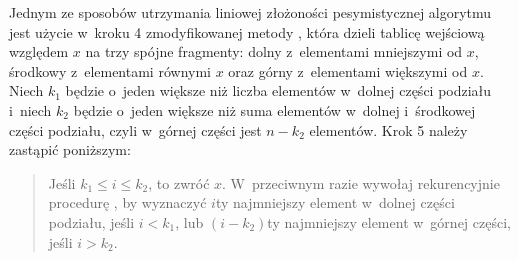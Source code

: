 Jednym ze sposobów utrzymania liniowej złożoności pesymistycznej algorytmu  jest użycie w~kroku 4 zmodyfikowanej metody , która dzieli tablicę wejściową względem $x$ na trzy spójne fragmenty: dolny z~elementami mniejszymi od $x$, środkowy z~elementami równymi $x$ oraz górny z~elementami większymi od $x$.
Niech $k_1$ będzie o~jeden większe niż liczba elementów w~dolnej części podziału i~niech $k_2$ będzie o~jeden większe niż suma elementów w~dolnej i~środkowej części podziału, czyli w~górnej części jest $n-k_2$ elementów.
Krok 5 należy zastąpić poniższym:
\begin{quote}
	Jeśli $k_1\le i\le k_2$, to zwróć $x$.
	W~przeciwnym razie wywołaj rekurencyjnie procedurę , by wyznaczyć $i$\nbhyphen ty najmniejszy element w~dolnej części podziału, jeśli $i<k_1$, lub $(i-k_2)$\nbhyphen ty najmniejszy element w~górnej części, jeśli $i>k_2$.
\end{quote}
